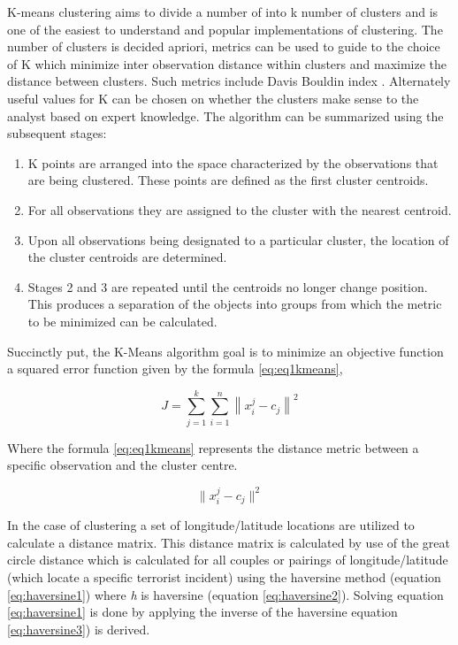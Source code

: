 K-means clustering aims to divide a number of into k number of clusters and is one of the easiest to understand and popular implementations of clustering. The number of clusters is decided apriori, metrics can be used to guide to the choice of K which minimize inter observation distance within clusters and maximize the distance between clusters. Such metrics include Davis Bouldin index \citep{davies1979cluster}. Alternately useful values for K can be chosen on whether the clusters make sense to the analyst based on expert knowledge. The algorithm can be summarized using the subsequent stages:
\begin{enumerate}
\item K points are arranged into the space characterized by the observations that are being clustered. These points are defined as the first cluster centroids.
\item For all observations they are assigned to the cluster with the nearest centroid.
\item Upon all observations being designated to a particular cluster, the location of the cluster centroids are determined.
\item Stages 2 and 3 are repeated until the centroids no longer change position. This produces a separation of the objects into groups from which the metric to be minimized can be calculated.
\end{enumerate}
Succinctly put, the K-Means algorithm goal is to minimize an objective function a squared error function given by the formula \ref{eq:eq1kmeans}, 

\begin{equation} J=\sum_{j=1}^{k}\sum_{i=1}^{n}\left \| x_{i}^{j} - c_{j} \right \|^{2} \label{eq:eq1kmeans}  \end{equation}

Where the formula \ref{eq:eq1kmeans} represents the distance metric between a specific observation and the cluster centre. 

\begin{equation} \| x_{i}^{j} - c_{j} \|^{2}  \label{eq:eq2kmeans}  \end{equation}

In the case of clustering  a set of longitude/latitude locations are utilized to calculate a distance matrix. This distance matrix is calculated by use of the great circle distance which is calculated for all couples or pairings of longitude/latitude (which locate a specific terrorist incident) using the haversine method (equation \ref{eq:haversine1}) where \textit{h} is haversine (equation \ref{eq:haversine2}). Solving equation \ref{eq:haversine1} is done by applying the inverse of the haversine equation \ref{eq:haversine3}) is derived.  

